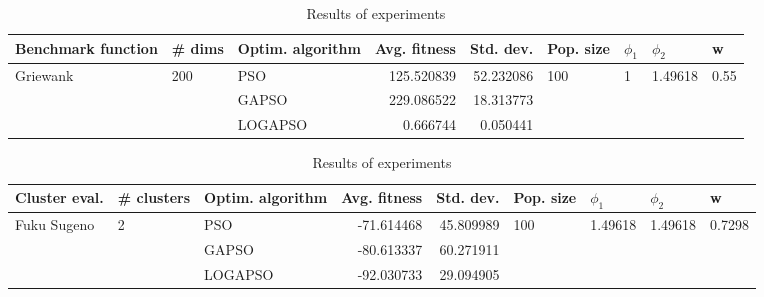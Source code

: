 \documentclass{article}
\begin{document}
\begin{table}
\centering
\caption{Results of experiments}
\begin{tabular}{lllrrllll}
\toprule
       Benchmark function &              \# dims & Optim. algorithm &  Avg. fitness &  Std. dev. &            Pop. size &         $\phi_{1}$ &               $\phi_{2}$ &                     w \\
\midrule
\multirow{3}{*}{Griewank} & \multirow{3}{*}{200} &              PSO &    125.520839 &  52.232086 & \multirow{3}{*}{100} & \multirow{3}{*}{1} & \multirow{3}{*}{1.49618} & \multirow{3}{*}{0.55} \\
                          &                      &            GAPSO &    229.086522 &  18.313773 &                      &                    &                          &                       \\
                          &                      &          LOGAPSO &      0.666744 &   0.050441 &                      &                    &                          &                       \\
\bottomrule
\end{tabular}
\end{table}
\begin{table}
\centering
\caption{Results of experiments}
\begin{tabular}{lllrrllll}
\toprule
               Cluster eval. &        \# clusters & Optim. algorithm &  Avg. fitness &  Std. dev. &            Pop. size &               $\phi_{1}$ &               $\phi_{2}$ &                       w \\
\midrule
\multirow{3}{*}{Fuku Sugeno} & \multirow{3}{*}{2} &              PSO &    -71.614468 &  45.809989 & \multirow{3}{*}{100} & \multirow{3}{*}{1.49618} & \multirow{3}{*}{1.49618} & \multirow{3}{*}{0.7298} \\
                             &                    &            GAPSO &    -80.613337 &  60.271911 &                      &                          &                          &                         \\
                             &                    &          LOGAPSO &    -92.030733 &  29.094905 &                      &                          &                          &                         \\
\bottomrule
\end{tabular}
\end{table}
\end{document}
